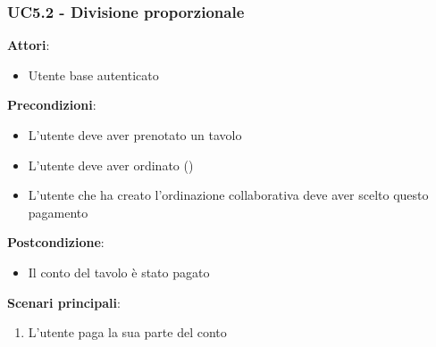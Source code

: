 \subsubsection{UC5.2 - Divisione proporzionale}\label{usecase:5.2}
\textbf{Attori}:
\begin{itemize}
    \item Utente base autenticato
\end{itemize}
\textbf{Precondizioni}:
\begin{itemize}
    \item L'utente deve aver prenotato un tavolo
    \item L'utente deve aver ordinato ()
    \item L'utente che ha creato l'ordinazione collaborativa deve aver scelto questo pagamento
\end{itemize}
\textbf{Postcondizione}:
\begin{itemize}
    \item Il conto del tavolo è stato pagato
\end{itemize}
\textbf{Scenari principali}:
\begin{enumerate}
    \item L'utente paga la sua parte del conto
\end{enumerate}